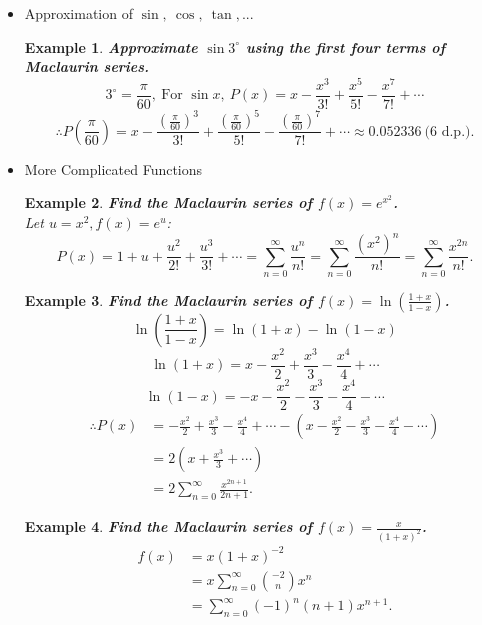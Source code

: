 \documentclass[12pt, a4paper]{article}
\newtheorem{example}{Example}[subsection]
\begin{document}
\begin{enumerate}
\begin{itemize}
        \item Approximation of $\sin,\ \cos,\ \tan,...$
        \begin{example}
            \textbf{Approximate $\sin 3^\circ$ using the first four terms of Maclaurin series.}
            $$3^\circ=\frac{\pi}{60},\ \text{For }\sin x,\ P(x)=x-\frac{x^3}{3!}+\frac{x^5}{5!}-\frac{x^7}{7!}+\cdots$$
            $$\therefore P\left(\frac{\pi}{60}\right)=x-\frac{\left(\frac{\pi}{60}\right)^3}{3!}+\frac{\left(\frac{\pi}{60}\right)^5}{5!}-\frac{\left(\frac{\pi}{60}\right)^7}{7!}+\cdots\approx 0.052336\ \text{(6 d.p.)}.$$
        \end{example}
        \item More Complicated Functions
        \begin{example}
            \textbf{Find the Maclaurin series of $f(x)=e^{x^2}$.}\\
            Let $u=x^2, f(x)=e^u$:
            $$P(x)=1+u+\frac{u^2}{2!}+\frac{u^3}{3!}+\cdots=\sum_{n=0}^\infty\frac{u^n}{n!}=\sum_{n=0}^\infty\frac{\left(x^2\right)^n}{n!}=\sum_{n=0}^\infty\frac{x^{2n}}{n!}.$$
        \end{example}
        \begin{example}
            \textbf{Find the Maclaurin series of $f(x)=\ln\left(\frac{1+x}{1-x}\right)$.}
            $$\ln\left(\frac{1+x}{1-x}\right)=\ln(1+x)-\ln(1-x)$$
            $$\ln(1+x)=x-\frac{x^2}{2}+\frac{x^3}{3}-\frac{x^4}{4}+\cdots$$
            $$\ln(1-x)=-x-\frac{x^2}{2}-\frac{x^3}{3}-\frac{x^4}{4}-\cdots$$
            $$\begin{aligned}
                \therefore P(x)&=-\frac{x^2}{2}+\frac{x^3}{3}-\frac{x^4}{4}+\cdots-\left(x-\frac{x^2}{2}-\frac{x^3}{3}-\frac{x^4}{4}-\cdots\right)\\
                &=2(x+\frac{x^3}{3}+\cdots)\\
                &=2\sum_{n=0}^\infty\frac{x^{2n+1}}{2n+1}.
            \end{aligned}$$
        \end{example}
        \begin{example}
            \textbf{Find the Maclaurin series of $f(x)=\frac{x}{(1+x)^2}$.}
        $$\begin{aligned}
                f(x)&=x(1+x)^{-2}\\
                &=x\sum_{n=0}^\infty\binom{-2}{n}x^n\\
                &=\sum_{n=0}^\infty(-1)^n(n+1)x^{n+1}.
            \end{aligned}$$
        \end{example}

\end{itemize}
\end{enumerate}
\end{document}
